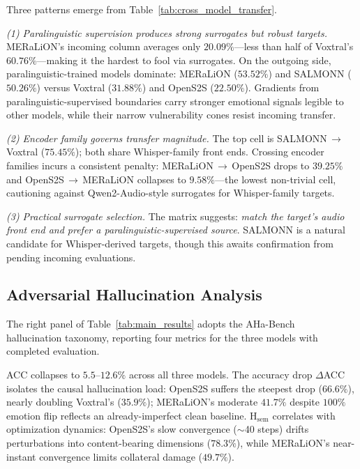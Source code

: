 Three patterns emerge from Table~\ref{tab:cross_model_transfer}.

\textit{(1) Paralinguistic supervision produces strong surrogates but robust targets.}
MERaLiON's incoming column averages only $20.09\%$---less than half of Voxtral's $60.76\%$---making it the hardest to fool via surrogates.
On the outgoing side, paralinguistic-trained models dominate: MERaLiON ($53.52\%$) and SALMONN ($50.26\%$) versus Voxtral ($31.88\%$) and OpenS2S ($22.50\%$).
Gradients from paralinguistic-supervised boundaries carry stronger emotional signals legible to other models, while their narrow vulnerability cones resist incoming transfer.

\textit{(2) Encoder family governs transfer magnitude.}
The top cell is SALMONN\,$\rightarrow$\,Voxtral ($75.45\%$); both share Whisper-family front ends.
Crossing encoder families incurs a consistent penalty: MERaLiON\,$\rightarrow$\,OpenS2S drops to $39.25\%$ and OpenS2S\,$\rightarrow$\,MERaLiON collapses to $9.58\%$---the lowest non-trivial cell, cautioning against Qwen2-Audio-style surrogates for Whisper-family targets.

\textit{(3) Practical surrogate selection.}
The matrix suggests: \emph{match the target's audio front end and prefer a paralinguistic-supervised source}.
SALMONN is a natural candidate for Whisper-derived targets, though this awaits confirmation from pending incoming evaluations.


\subsection{Adversarial Hallucination Analysis}
\label{sec:exp_quality}

The right panel of Table~\ref{tab:main_results} adopts the AHa-Bench~\cite{aha-bench} hallucination taxonomy, reporting four metrics for the three models with completed evaluation.

ACC collapses to $5.5$--$12.6\%$ across all three models.
The accuracy drop $\Delta$ACC isolates the causal hallucination load: OpenS2S suffers the steepest drop ($66.6\%$), nearly doubling Voxtral's ($35.9\%$); MERaLiON's moderate $41.7\%$ despite $100\%$ emotion flip reflects an already-imperfect clean baseline.
H$_{\text{sem}}$ correlates with optimization dynamics: OpenS2S's slow convergence ($\sim$40 steps) drifts perturbations into content-bearing dimensions ($78.3\%$), while MERaLiON's near-instant convergence limits collateral damage ($49.7\%$).

